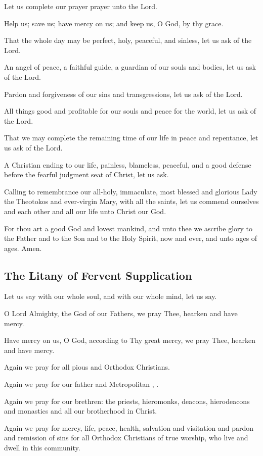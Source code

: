 Let us complete our prayer prayer unto the Lord.

Help us; save us; have mercy on us; and keep us, O God, by thy grace.

That the whole day  may be perfect, holy, peaceful, and sinless, let us ask of the Lord.

An angel of peace, a faithful guide, a guardian of our souls and bodies, let us ask of the Lord.

Pardon and forgiveness of our sins and transgressions, let us ask of the Lord.

All things good and profitable for our souls and peace for the world, let us ask of the Lord.

That we may complete the remaining time of our life in peace and repentance, let us ask of the Lord.

A Christian ending to our life, painless, blameless, peaceful, and a good defense before the fearful judgment seat of Christ, let us ask.

Calling to remembrance our all-holy, immaculate, most blessed and glorious Lady the Theotokos and ever-virgin Mary, with all the saints, let us commend ourselves and each other and all our life unto Christ our God.

For thou art a good God and lovest mankind, and unto thee we ascribe glory to the Father and to the Son and to the Holy Spirit, now and ever, and unto ages of ages. Amen.

\subsection{The Litany of Fervent Supplication}

Let us say with our whole soul, and with our whole mind, let us say.

O Lord Almighty, the God of our Fathers, we pray Thee, hearken and have mercy.

Have mercy on us, O God, according to Thy great mercy, we pray Thee, hearken and have mercy.

Again we pray for all pious and Orthodox Christians.

Again we pray for our father and Metropolitan , .

Again we pray for our brethren: the priests, hieromonks, deacons, hierodeacons and monastics and all our brotherhood in Christ.

Again we pray for mercy, life, peace, health, salvation and visitation and pardon and remission of sins for  all Orthodox Christians of true worship, who live and dwell in this community.

